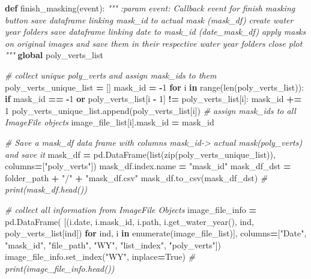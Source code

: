 \documentclass[
]{article}
\newenvironment{Shaded}{\begin{snugshade}}{\end{snugshade}}
\newcommand{\BuiltInTok}[1]{#1}
\newcommand{\CommentTok}[1]{\textcolor[rgb]{0.56,0.35,0.01}{\textit{#1}}}
\newcommand{\ControlFlowTok}[1]{\textcolor[rgb]{0.13,0.29,0.53}{\textbf{#1}}}
\newcommand{\DecValTok}[1]{\textcolor[rgb]{0.00,0.00,0.81}{#1}}
\newcommand{\KeywordTok}[1]{\textcolor[rgb]{0.13,0.29,0.53}{\textbf{#1}}}
\newcommand{\NormalTok}[1]{#1}
\newcommand{\OperatorTok}[1]{\textcolor[rgb]{0.81,0.36,0.00}{\textbf{#1}}}
\newcommand{\StringTok}[1]{\textcolor[rgb]{0.31,0.60,0.02}{#1}}
\newcommand{\VariableTok}[1]{\textcolor[rgb]{0.00,0.00,0.00}{#1}}
\begin{document}
\begin{Shaded}
\begin{Highlighting}[]
\KeywordTok{def}\NormalTok{ finish\_masking(event):}
    \CommentTok{"""}
\CommentTok{        :param event: Callback event for finish masking button}
\CommentTok{        save dataframe linking mask\_id to actual mask  (mask\_df)}
\CommentTok{        create water year folders}
\CommentTok{        save dataframe linking date to mask\_id (date\_mask\_df)}
\CommentTok{        apply masks on original images and save them in their respective water year folders}
\CommentTok{        close plot}
\CommentTok{    """}
    \KeywordTok{global}\NormalTok{ poly\_verts\_list}

    \CommentTok{\# collect unique poly\_verts and assign mask\_ids to them}
\NormalTok{    poly\_verts\_unique\_list }\OperatorTok{=}\NormalTok{ []}
\NormalTok{    mask\_id }\OperatorTok{=} \OperatorTok{{-}}\DecValTok{1}
    \ControlFlowTok{for}\NormalTok{ i }\KeywordTok{in} \BuiltInTok{range}\NormalTok{(}\BuiltInTok{len}\NormalTok{(poly\_verts\_list)):}
        \ControlFlowTok{if}\NormalTok{ mask\_id }\OperatorTok{==} \OperatorTok{{-}}\DecValTok{1} \KeywordTok{or}\NormalTok{ poly\_verts\_list[i }\OperatorTok{{-}} \DecValTok{1}\NormalTok{] }\OperatorTok{!=}\NormalTok{ poly\_verts\_list[i]:}
\NormalTok{            mask\_id }\OperatorTok{+=} \DecValTok{1}
\NormalTok{            poly\_verts\_unique\_list.append(poly\_verts\_list[i])}
        \CommentTok{\# assign mask\_ids to all ImageFile objects}
\NormalTok{        image\_file\_list[i].mask\_id }\OperatorTok{=}\NormalTok{ mask\_id}

    \CommentTok{\# Save a mask\_df data frame with columns mask\_id{-}\textgreater{} actual mask(poly\_verts) and save it}
\NormalTok{    mask\_df }\OperatorTok{=}\NormalTok{ pd.DataFrame(}\BuiltInTok{list}\NormalTok{(}\BuiltInTok{zip}\NormalTok{(poly\_verts\_unique\_list)), columns}\OperatorTok{=}\NormalTok{[}\StringTok{"poly\_verts"}\NormalTok{])}
\NormalTok{    mask\_df.index.name }\OperatorTok{=} \StringTok{"mask\_id"}
\NormalTok{    mask\_df\_dst }\OperatorTok{=}\NormalTok{ folder\_path }\OperatorTok{+} \StringTok{"/"} \OperatorTok{+} \StringTok{"mask\_df.csv"}
\NormalTok{    mask\_df.to\_csv(mask\_df\_dst)}
    \CommentTok{\# print(mask\_df.head())}

    \CommentTok{\# collect all information from ImageFile Objects}
\NormalTok{    image\_file\_info }\OperatorTok{=}\NormalTok{ pd.DataFrame(}
\NormalTok{        [(i.date, i.mask\_id, i.path, i.get\_water\_year(), ind, poly\_verts\_list[ind]) }\ControlFlowTok{for}\NormalTok{ ind, i }\KeywordTok{in}
         \BuiltInTok{enumerate}\NormalTok{(image\_file\_list)],}
\NormalTok{        columns}\OperatorTok{=}\NormalTok{[}\StringTok{"Date"}\NormalTok{, }\StringTok{"mask\_id"}\NormalTok{, }\StringTok{"file\_path"}\NormalTok{, }\StringTok{"WY"}\NormalTok{, }\StringTok{"list\_index"}\NormalTok{, }\StringTok{"poly\_verts"}\NormalTok{])}
\NormalTok{    image\_file\_info.set\_index(}\StringTok{"WY"}\NormalTok{, inplace}\OperatorTok{=}\VariableTok{True}\NormalTok{)}
    \CommentTok{\# print(image\_file\_info.head())}


\end{Highlighting}
\end{Shaded}
\end{document}
